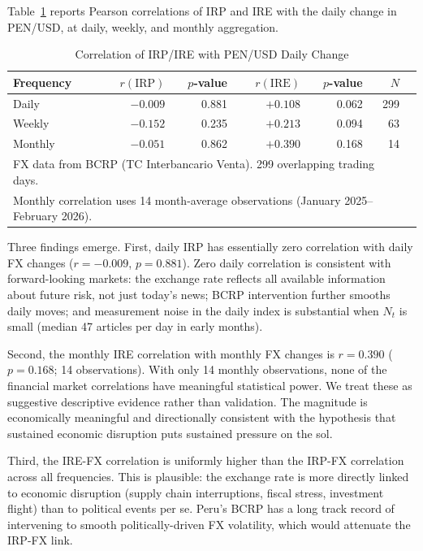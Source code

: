 \documentclass[12pt,a4paper]{article}
\begin{document}
Table~\ref{tab:fx} reports Pearson correlations of IRP and IRE with the
daily change in PEN/USD, at daily, weekly, and monthly aggregation.

\begin{table}[h!]
\centering
\caption{Correlation of IRP/IRE with PEN/USD Daily Change}
\label{tab:fx}
\begin{tabular}{lrrrrrr}
\toprule
Frequency & $r(\text{IRP})$ & $p$-value & $r(\text{IRE})$ & $p$-value & $N$ \\
\midrule
Daily   & $-0.009$ & 0.881 & $+0.108$ & 0.062 & 299 \\
Weekly  & $-0.152$ & 0.235 & $+0.213$ & 0.094 &  63 \\
Monthly & $-0.051$ & 0.862 & $+0.390$ & 0.168 &  14 \\
\bottomrule
\multicolumn{6}{l}{\footnotesize FX data from BCRP (TC Interbancario Venta). 299 overlapping trading days.} \\
\multicolumn{6}{l}{\footnotesize Monthly correlation uses 14 month-average observations (January 2025--February 2026).}
\end{tabular}
\end{table}

Three findings emerge.  First, daily IRP has essentially zero correlation
with daily FX changes ($r = -0.009$, $p = 0.881$).  Zero daily correlation
is consistent with forward-looking markets: the exchange rate reflects all
available information about future risk, not just today's news; BCRP
intervention further smooths daily moves; and measurement noise in the
daily index is substantial when $N_t$ is small (median 47 articles per day
in early months).

Second, the monthly IRE correlation with monthly FX changes is $r = 0.390$
($p = 0.168$; 14 observations).  With only 14 monthly observations, none
of the financial market correlations have meaningful statistical power.
We treat these as suggestive descriptive evidence rather than validation.
The magnitude is economically meaningful and directionally consistent with
the hypothesis that sustained economic disruption puts sustained pressure
on the sol.

Third, the IRE-FX correlation is uniformly higher than the IRP-FX
correlation across all frequencies.  This is plausible: the exchange rate
is more directly linked to economic disruption (supply chain interruptions,
fiscal stress, investment flight) than to political events per se.  Peru's
BCRP has a long track record of intervening to smooth politically-driven
FX volatility, which would attenuate the IRP-FX link.
\end{document}
